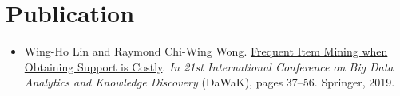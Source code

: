 \documentclass[10pt, oneside]{article}
\begin{document}
\section*{Publication}
\begin{itemize}
	\item Wing-Ho Lin and Raymond Chi-Wing Wong. \href{https://link.springer.com/chapter/10.1007/978-3-030-27520-4_4}{Frequent Item Mining when Obtaining Support is Costly}. \textit{In 21st International Conference on Big Data Analytics and Knowledge Discovery} (DaWaK), pages 37--56. Springer, 2019.	
	
\end{itemize}

\end{document}
